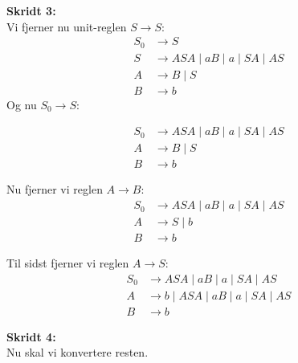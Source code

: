\begin{example}
	\noindent
	\textbf{\large Skridt 3:}\\
	\noindent
	Vi fjerner nu unit-reglen $S \rightarrow S$:
	\begin{equation*}
		\begin{split}
			S_{0} & \rightarrow S                                      \\
			S     & \rightarrow ASA \;|\; aB \;|\; a \;| \;SA \;| \;AS \\
			A     & \rightarrow B \;|\; S                              \\
			B     & \rightarrow b
		\end{split}
	\end{equation*}
	Og nu $S_{0} \rightarrow S$:


	\begin{equation*}
		\begin{split}
			S_{0} & \rightarrow ASA \;|\; aB \;|\; a \;| \;SA \;| \;AS \\
			A     & \rightarrow B \;|\; S                              \\
			B     & \rightarrow b
		\end{split}
	\end{equation*}

	Nu fjerner vi reglen $A \rightarrow B$:
	\begin{equation*}
		\begin{split}
			S_{0} & \rightarrow ASA \;|\; aB \;|\; a \;| \;SA \;| \;AS \\
			A     & \rightarrow  S  \;|\; b                            \\
			B     & \rightarrow b
		\end{split}
	\end{equation*}

	Til sidst fjerner vi reglen $A \rightarrow S$:
	\begin{equation*}
		\begin{split}
			S_{0} & \rightarrow ASA \;|\; aB \;|\; a \;| \;SA \;| \;AS           \\
			A     & \rightarrow  b  \;|\; ASA \;|\; aB \;|\; a \;|\; SA \;|\; AS \\
			B     & \rightarrow b
		\end{split}
	\end{equation*}


	\noindent
	\textbf{\large Skridt 4:}\\
	\noindent
	Nu skal vi konvertere resten.


\end{example}
